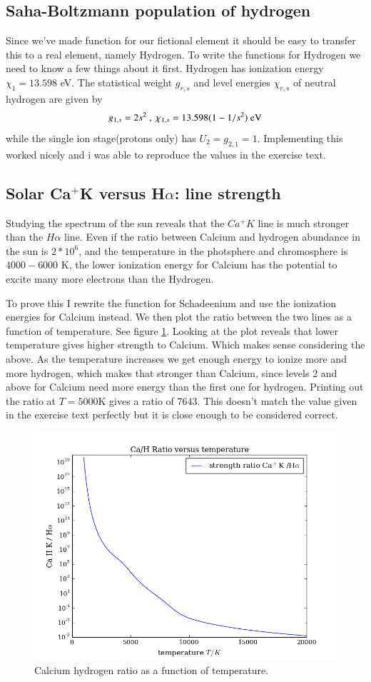 \documentclass{aa}   %
\begin{document}
\subsection{Saha-Boltzmann population of hydrogen}
Since we've made function for our fictional element it should be easy to transfer this to a real element, namely Hydrogen.
To write the functions for Hydrogen we need to know a few things about it first. Hydrogen has ionization energy $\chi_1 = 13.598$ eV. The statistical weight $g_{r,s}$ and level energies $\chi_{r,s}$ of neutral hydrogen are given by
\begin{equation*}
g_{1,s} = 2s^2 ~,~ \chi_{1,s} = 13.598(1-1/s^2) ~\textmd{eV}
\end{equation*}
while the single ion stage(protons only) has $U_2 = g_{2,1} = 1$.
Implementing this worked nicely and i was able to reproduce the values in the exercise text.
\subsection{Solar Ca$^+$K versus H$\alpha$: line strength}
Studying the spectrum of the sun reveals that the $Ca^+ K$ line is much stronger than the $H\alpha$ line. Even if the ratio between Calcium and hydrogen abundance in the sun is $2*10^6$, and the temperature in the photsphere and chromosphere is $4000-6000$ K, the lower ionization energy for Calcium has the potential to excite many more electrons than the Hydrogen.

To prove this I rewrite the function for Schadeenium and use the ionization energies for Calcium instead. We then plot the ratio between the two lines as a function of temperature. See figure \ref{CaHratio}. Looking at the plot reveals that lower temperature gives higher strength to Calcium. Which makes sense considering the above. As the temperature increases we get enough energy to ionize more and more hydrogen, which makes that stronger than Calcium, since levels 2 and above for Calcium need more energy than the first one for hydrogen. Printing out the ratio at $T = 5000$K gives a ratio of $7643$. This doesn't match the value given in the exercise text perfectly but it is close enough to be considered correct.
\begin{figure}
 \includegraphics[width=.49\textwidth]{CaHratio.png}
 \caption{Calcium hydrogen ratio as a function of temperature.}
 \label{CaHratio}
\end{figure}
\end{document}
